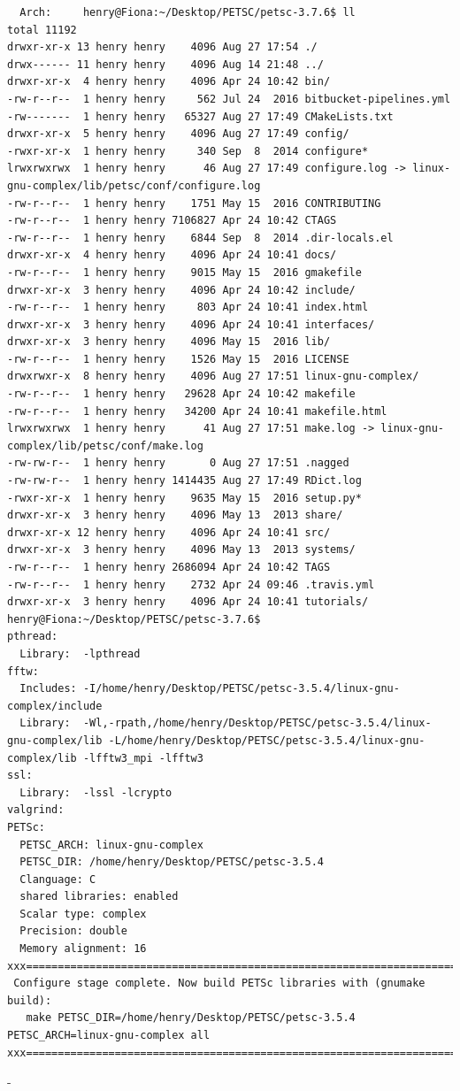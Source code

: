 \documentclass{article}
\begin{document}
\begin{verbatim}
  Arch:     henry@Fiona:~/Desktop/PETSC/petsc-3.7.6$ ll
total 11192
drwxr-xr-x 13 henry henry    4096 Aug 27 17:54 ./
drwx------ 11 henry henry    4096 Aug 14 21:48 ../
drwxr-xr-x  4 henry henry    4096 Apr 24 10:42 bin/
-rw-r--r--  1 henry henry     562 Jul 24  2016 bitbucket-pipelines.yml
-rw-------  1 henry henry   65327 Aug 27 17:49 CMakeLists.txt
drwxr-xr-x  5 henry henry    4096 Aug 27 17:49 config/
-rwxr-xr-x  1 henry henry     340 Sep  8  2014 configure*
lrwxrwxrwx  1 henry henry      46 Aug 27 17:49 configure.log -> linux-gnu-complex/lib/petsc/conf/configure.log
-rw-r--r--  1 henry henry    1751 May 15  2016 CONTRIBUTING
-rw-r--r--  1 henry henry 7106827 Apr 24 10:42 CTAGS
-rw-r--r--  1 henry henry    6844 Sep  8  2014 .dir-locals.el
drwxr-xr-x  4 henry henry    4096 Apr 24 10:41 docs/
-rw-r--r--  1 henry henry    9015 May 15  2016 gmakefile
drwxr-xr-x  3 henry henry    4096 Apr 24 10:42 include/
-rw-r--r--  1 henry henry     803 Apr 24 10:41 index.html
drwxr-xr-x  3 henry henry    4096 Apr 24 10:41 interfaces/
drwxr-xr-x  3 henry henry    4096 May 15  2016 lib/
-rw-r--r--  1 henry henry    1526 May 15  2016 LICENSE
drwxrwxr-x  8 henry henry    4096 Aug 27 17:51 linux-gnu-complex/
-rw-r--r--  1 henry henry   29628 Apr 24 10:42 makefile
-rw-r--r--  1 henry henry   34200 Apr 24 10:41 makefile.html
lrwxrwxrwx  1 henry henry      41 Aug 27 17:51 make.log -> linux-gnu-complex/lib/petsc/conf/make.log
-rw-rw-r--  1 henry henry       0 Aug 27 17:51 .nagged
-rw-rw-r--  1 henry henry 1414435 Aug 27 17:49 RDict.log
-rwxr-xr-x  1 henry henry    9635 May 15  2016 setup.py*
drwxr-xr-x  3 henry henry    4096 May 13  2013 share/
drwxr-xr-x 12 henry henry    4096 Apr 24 10:41 src/
drwxr-xr-x  3 henry henry    4096 May 13  2013 systems/
-rw-r--r--  1 henry henry 2686094 Apr 24 10:42 TAGS
-rw-r--r--  1 henry henry    2732 Apr 24 09:46 .travis.yml
drwxr-xr-x  3 henry henry    4096 Apr 24 10:41 tutorials/
henry@Fiona:~/Desktop/PETSC/petsc-3.7.6$
pthread:
  Library:  -lpthread
fftw:
  Includes: -I/home/henry/Desktop/PETSC/petsc-3.5.4/linux-gnu-complex/include
  Library:  -Wl,-rpath,/home/henry/Desktop/PETSC/petsc-3.5.4/linux-gnu-complex/lib -L/home/henry/Desktop/PETSC/petsc-3.5.4/linux-gnu-complex/lib -lfftw3_mpi -lfftw3
ssl:
  Library:  -lssl -lcrypto
valgrind:
PETSc:
  PETSC_ARCH: linux-gnu-complex
  PETSC_DIR: /home/henry/Desktop/PETSC/petsc-3.5.4
  Clanguage: C
  shared libraries: enabled
  Scalar type: complex
  Precision: double
  Memory alignment: 16
xxx=========================================================================xxx
 Configure stage complete. Now build PETSc libraries with (gnumake build):
   make PETSC_DIR=/home/henry/Desktop/PETSC/petsc-3.5.4 PETSC_ARCH=linux-gnu-complex all
xxx=========================================================================xxx
\end{verbatim}-
\end{document}
